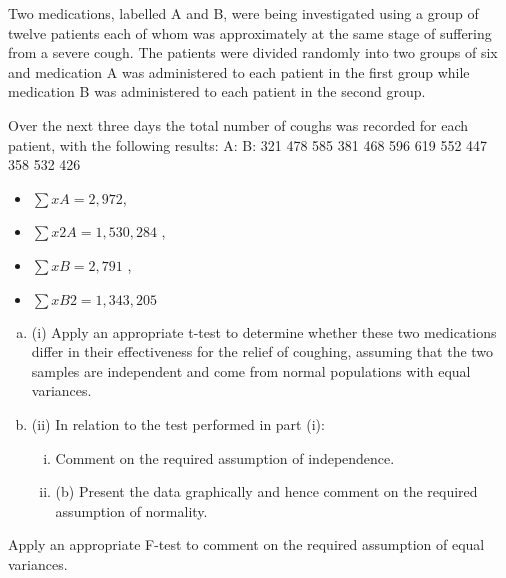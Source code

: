 \documentclass[a4paper,12pt]{article}
\begin{document}
Two medications, labelled A and B, were being investigated using a group of twelve patients each of whom was approximately at the same stage of suffering from a severe cough. The patients were divided randomly into two groups of six and medication A
was administered to each patient in the first group while medication B was administered to each patient in the second group. 

Over the next three days the total number of coughs was recorded for each patient, with the following results:
A:
B:
321
478
585
381
468
596
619
552
447
358
532
426

\begin{itemize}
    \item ${ \displaystyle \sum  x A = 2,972 }$, 
    \item ${ \displaystyle \sum x 2 A = 1,530, 284}$ , 
    \item ${ \displaystyle \sum  x B = 2, 791}$ , 
     \item ${ \displaystyle \sum  x B 2 = 1,343, 205}$
\end{itemize}
\begin{enumerate}[(a)]
\item (i) Apply an appropriate t-test to determine whether these two medications differ in their effectiveness for the relief of coughing, assuming that the two samples are independent and come from normal populations with equal variances. 
\item (ii) In relation to the test performed in part (i):
\begin{enumerate}[(i)]
\item  Comment on the required assumption of independence.
\item (b) Present the data graphically and hence comment on the required assumption of normality.

\end{enumerate}
\end{enumerate}
Apply an appropriate F-test to comment on the required assumption of equal variances.
\end{document}
